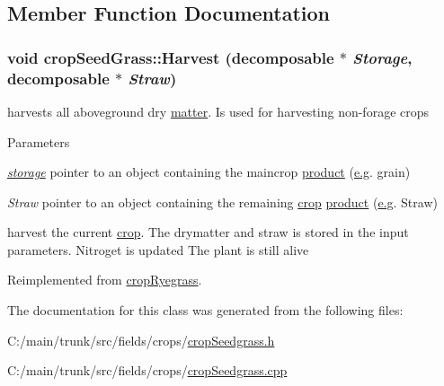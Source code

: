 \subsection{Member Function Documentation}
\hypertarget{classcrop_seed_grass_a3415f1b4d08da621709cbb07156137e0}{
\subsubsection[{Harvest}]{\setlength{\rightskip}{0pt plus 5cm}void cropSeedGrass::Harvest ({\bf decomposable} $\ast$ {\em Storage}, \/  {\bf decomposable} $\ast$ {\em Straw})}}
\label{classcrop_seed_grass_a3415f1b4d08da621709cbb07156137e0}


harvests all aboveground dry \hyperlink{classmatter}{matter}. Is used for harvesting non-\/forage crops 
\begin{DoxyParams}{Parameters}
\item[{\em \hyperlink{classstorage}{storage}}]pointer to an object containing the maincrop \hyperlink{classproduct}{product} (\hyperlink{typer_8h_ae4c405e5c68c6ec2c44bb6d6adfc2f6ca35c0bb7088830963c73dcf0470ab8922}{e.g}. grain) \item[{\em Straw}]pointer to an object containing the remaining \hyperlink{classcrop}{crop} \hyperlink{classproduct}{product} (\hyperlink{typer_8h_ae4c405e5c68c6ec2c44bb6d6adfc2f6ca35c0bb7088830963c73dcf0470ab8922}{e.g}. Straw)\end{DoxyParams}
harvest the current \hyperlink{classcrop}{crop}. The drymatter and straw is stored in the input parameters. Nitroget is updated The plant is still alive 

Reimplemented from \hyperlink{classcrop_ryegrass_a33a0c70645ce03afc49541e8d3f4919b}{cropRyegrass}.

The documentation for this class was generated from the following files:\begin{DoxyCompactItemize}
\item 
C:/main/trunk/src/fields/crops/\hyperlink{crop_seedgrass_8h}{cropSeedgrass.h}\item 
C:/main/trunk/src/fields/crops/\hyperlink{crop_seedgrass_8cpp}{cropSeedgrass.cpp}\end{DoxyCompactItemize}
